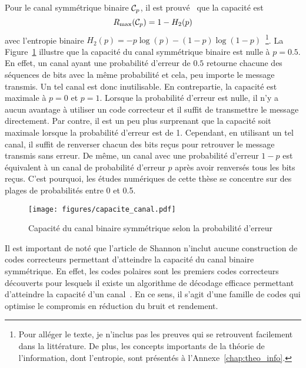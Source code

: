 Pour le canal symmétrique binaire $\mathcal{C}_p$, 
il est prouvé~\cite{shannon_mathematical_1948} que la capacité est 
\begin{equation}
  R_{\text{max}}(\mathcal{C}_p) = 1 - H_2(p)
\end{equation}
avec l'entropie binaire $H_2(p) = -p \log(p) - (1 - p)\log(1 - p)$~\footnote{
  Pour alléger le texte, je n'inclus pas les preuves qui se retrouvent facilement 
  dans la littérature.
  De plus, les concepts importants de la théorie de l'information, dont l'entropie, 
  sont présentés à l'Annexe~\ref{chap:theo_info}.
}. 
La Figure~\ref{fig:capacite_canal} illustre que la capacité du canal symmétrique binaire 
est nulle à $p = 0.5$.
En effet, un canal ayant une probabilité d'erreur de $0.5$ retourne 
chacune des séquences de bits avec la même probabilité 
et cela, peu importe le message transmis.
Un tel canal est donc inutilisable.
En contrepartie, la capacité est maximale à $p = 0$ et $p = 1$.
Lorsque la probabilité d'erreur est nulle,
il n'y a aucun avantage à utiliser un code correcteur 
et il suffit de transmettre le message directement.
Par contre, il est un peu plus surprenant que la capacité soit maximale lorsque la probabilité
d'erreur est de 1.
Cependant, en utilisant un tel canal, 
il suffit de renverser chacun des bits reçus pour retrouver le message transmis sans erreur.
De même, 
un canal avec une probabilité d'erreur $1 - p$ est équivalent à un canal de probabilité d'erreur $p$
après avoir renversés tous les bits reçus.
C'est pourquoi, 
les études numériques de cette thèse se concentre sur des plages de probabilités entre 0 et 0.5.

\begin{figure}
  \begin{center}
    \texttt{[image: figures/capacite\_canal.pdf]}
  \end{center}
  \caption{Capacité du canal binaire symmétrique selon la probabilité d'erreur}
  \label{fig:capacite_canal}
\end{figure}

Il est important de noté que l'article de Shannon n'inclut aucune construction de codes 
correcteurs permettant d'atteindre la capacité du canal binaire symmétrique.
En effet, les codes polaires sont les premiers codes correcteurs découverts 
pour lesquels il existe un algorithme de décodage efficace permettant d'atteindre 
la capacité d'un canal~\cite{arikan_channel_2009}. 
En ce sens, il s'agit d'une famille de codes qui optimise le compromis en réduction du bruit 
et rendement.

